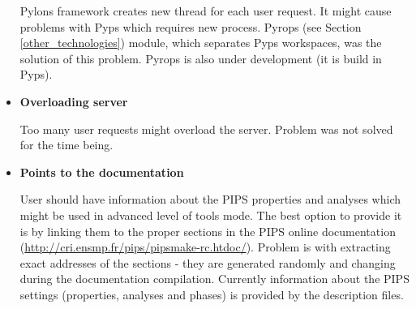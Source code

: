 \begin{itemize}
  Pylons framework creates new thread for each user request. It might cause problems with Pyps which requires new process. Pyrops (see Section \ref{other_technologies}) module, which separates Pyps workspaces, was the solution of this problem. Pyrops is also under development (it is build in Pyps).
  
  \item {\bf Overloading server}
  
  Too many user requests might overload the server. Problem was not solved for the time being.
  
  \item {\bf Points to the documentation}
  
  User should have information about the PIPS properties and analyses which might be used in advanced level of tools mode. The best option to provide it is by linking them to the proper sections in the PIPS online documentation (\url{http://cri.ensmp.fr/pips/pipsmake-rc.htdoc/}). Problem is with extracting exact addresses of the sections - they are generated randomly and changing during the documentation compilation. Currently information about the PIPS settings (properties, analyses and phases) is provided by the description files.

\end{itemize}